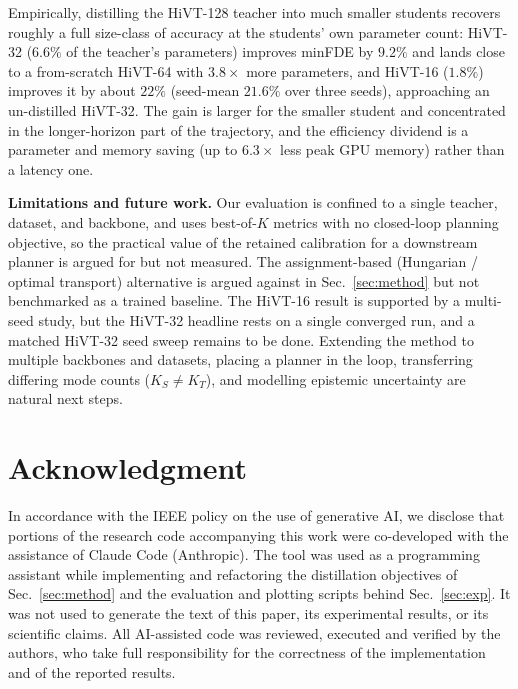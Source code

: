 \documentclass[conference]{IEEEtran}
\begin{document}
Empirically, distilling the HiVT-128 teacher into much smaller students recovers
roughly a full size-class of accuracy at the students' own parameter count: HiVT-32
($6.6\%$ of the teacher's parameters) improves minFDE by $9.2\%$ and lands close to a
from-scratch HiVT-64 with $3.8\times$ more parameters, and HiVT-16 ($1.8\%$) improves
it by about $22\%$ (seed-mean $21.6\%$ over three seeds), approaching an un-distilled
HiVT-32. The gain is larger for the smaller student and concentrated in the
longer-horizon part of the trajectory, and the efficiency dividend is a parameter and
memory saving (up to $6.3\times$ less peak GPU memory) rather than a latency one.

\textbf{Limitations and future work.} Our evaluation is confined to a single teacher,
dataset, and backbone, and uses best-of-$K$ metrics with no closed-loop planning
objective, so the practical value of the retained calibration for a downstream
planner is argued for but not measured. The assignment-based (Hungarian / optimal transport)
alternative is argued against in Sec.~\ref{sec:method} but not benchmarked as a
trained baseline. The HiVT-16 result is supported by a multi-seed study, but the HiVT-32
headline rests on a single converged run, and a matched HiVT-32 seed sweep remains to
be done. Extending the method to multiple backbones and datasets, placing a planner in
the loop, transferring differing mode counts ($K_S \neq K_T$), and modelling epistemic
uncertainty are natural next steps.

\section*{Acknowledgment}
In accordance with the IEEE policy on the use of generative AI, we disclose
that portions of the research code accompanying this work were co-developed
with the assistance of Claude Code (Anthropic). The tool was used as a
programming assistant while implementing and refactoring the distillation
objectives of Sec.~\ref{sec:method} and the evaluation and plotting scripts
behind Sec.~\ref{sec:exp}. It was not used to generate the text of this
paper, its experimental results, or its scientific claims. All
AI-assisted code was reviewed, executed and verified by the authors, who
take full responsibility for the correctness of the implementation and of
the reported results.
\end{document}
